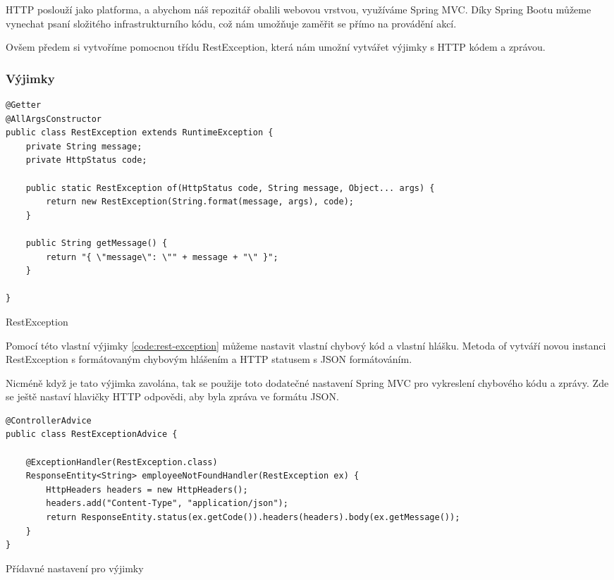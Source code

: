 HTTP poslouží jako platforma, a abychom náš repozitář obalili webovou vrstvou, využíváme Spring MVC. Díky Spring Bootu můžeme vynechat psaní složitého infrastrukturního kódu, což nám umožňuje zaměřit se přímo na provádění akcí.

Ovšem předem si vytvoříme pomocnou třídu RestException, která nám umožní vytvářet výjimky s HTTP kódem a zprávou.
\subsubsection*{Výjimky}
\begin{listing}[H]
    \begin{verbatim}
@Getter
@AllArgsConstructor
public class RestException extends RuntimeException {
    private String message;
    private HttpStatus code;

    public static RestException of(HttpStatus code, String message, Object... args) {
        return new RestException(String.format(message, args), code);
    }

    public String getMessage() {
        return "{ \"message\": \"" + message + "\" }";
    }

}
    \end{verbatim}
    \caption{RestException}
    \label{code:rest-exception}
\end{listing}

Pomocí této vlastní výjimky \ref{code:rest-exception} můžeme nastavit vlastní chybový kód a vlastní hlášku. Metoda of vytváří novou instanci RestException s formátovaným chybovým hlášením a HTTP statusem s JSON formátováním.

Nicméně když je tato výjimka zavolána, tak se použije toto dodatečné nastavení Spring MVC pro vykreslení chybového kódu a zprávy. Zde se ještě nastaví hlavičky HTTP odpovědi, aby byla zpráva ve formátu JSON.

\begin{listing}[H]
    \begin{verbatim}
@ControllerAdvice
public class RestExceptionAdvice {

    @ExceptionHandler(RestException.class)
    ResponseEntity<String> employeeNotFoundHandler(RestException ex) {
        HttpHeaders headers = new HttpHeaders();
        headers.add("Content-Type", "application/json");
        return ResponseEntity.status(ex.getCode()).headers(headers).body(ex.getMessage());
    }
}
    \end{verbatim}
    \caption{Přídavné nastavení pro výjimky}
    \label{code:rest-exception-advice}
\end{listing}




